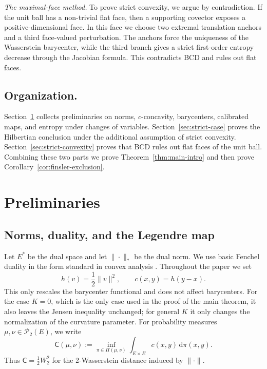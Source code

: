 \documentclass[10pt,a4paper]{amsart}
\numberwithin{equation}{section}
\newcommand{\dd}{\mathrm d}
\newcommand{\cP}{\mathcal P}
\begin{document}
	\medskip\noindent\textit{The maximal-face method.} To prove strict convexity, we argue by contradiction. If the unit ball has a non-trivial flat face, then a supporting covector exposes a positive-dimensional face. In this face we choose two extremal translation anchors and a third face-valued perturbation. The anchors force the uniqueness of the Wasserstein barycenter, while the third branch gives a strict first-order entropy decrease through the Jacobian formula. This contradicts BCD and rules out flat faces.
	
	
	
	\medskip
	
	\subsection*{Organization.}\label{subsec:organization}
	Section~\ref{sec:preliminaries} collects preliminaries on norms, \(c\)-concavity, barycenters, calibrated maps, and entropy under changes of variables. Section~\ref{sec:strict-case} proves the Hilbertian conclusion under the additional assumption of strict convexity. Section~\ref{sec:strict-convexity} proves that BCD rules out flat faces of the unit ball.  Combining these two parts we  prove Theorem~\ref{thm:main-intro} and then prove Corollary~\ref{cor:finsler-exclusion}.
	
	
	\section{Preliminaries}\label{sec:preliminaries}
	
	\subsection{Norms, duality, and the Legendre map}\label{subsec:norms-duality}
	
	Let $E^*$ be the dual space and let $\|\cdot\|_*$ be the dual norm. We use basic Fenchel duality in the form standard in convex analysis \cite{Rockafellar1970}. Throughout the paper we set
	\[
	h(v)=\frac12\|v\|^2,
	\qquad c(x,y)=h(y-x).
	\]
	This only rescales the barycenter functional and does not affect barycenters. For the case \(K=0\), which is the only case used in the proof of the main theorem, it also leaves the Jensen inequality unchanged; for general \(K\) it only changes the normalization of the curvature parameter.
	For probability measures \(\mu,\nu\in\cP_2(E)\), we write
	\[
	\mathsf C(\mu,\nu):=\inf_{\pi\in\Pi(\mu,\nu)}
	\int_{E\times E} c(x,y)\,\dd\pi(x,y).
	\]
	Thus \(\mathsf C=\frac12 W_2^2\) for the 2-Wasserstein distance induced by \(\|\cdot\|\).
	
\end{document}
